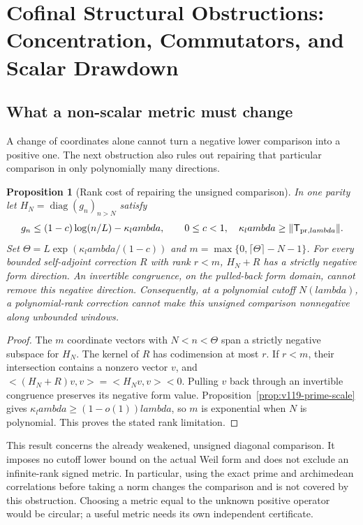 \documentclass[11pt]{article}
\def\lambda{lambda}%
\def\ip#1#2{<#1,#2>}%
\newtheorem{proposition}[theorem]{Proposition}
\theoremstyle{remark}
\newcommand{\ip}[2]{\left\langle #1,#2\right\rangle}
\begin{document}
\section{Cofinal Structural Obstructions: Concentration, Commutators, and Scalar Drawdown}\label{sec:pillar3a}

\subsection{What a non-scalar metric must change}
A change of coordinates alone cannot turn a negative lower comparison
into a positive one. The next obstruction also rules out repairing
that particular comparison in only polynomially many directions.

\begin{proposition}[Rank cost of repairing the unsigned comparison]
\label{prop:v127-rank-barrier}
In one parity let $H_N=\operatorname{diag}(g_n)_{n>N}$ satisfy
\[
 g_n\le(1-c)\log(n/L)-\kappa_\lambda,\qquad 0\le c<1,
 \quad \kappa_\lambda\ge\|\mathsf T_{{\rm pr},\lambda}\|.
\]
Set $\Theta=L\exp(\kappa_\lambda/(1-c))$ and
$m=\max\{0,\lceil\Theta\rceil-N-1\}$. For every bounded self-adjoint
correction $R$ with rank $r<m$, $H_N+R$ has a strictly negative
form direction. An invertible congruence, on the pulled-back form
domain, cannot remove this negative direction. Consequently, at a
polynomial cutoff $N(\lambda)$, a polynomial-rank correction cannot
make this unsigned comparison nonnegative along unbounded windows.
\end{proposition}
\begin{proof}
The $m$ coordinate vectors with $N<n<\Theta$ span a strictly negative
subspace for $H_N$. The kernel of $R$ has codimension at most $r$.
If $r<m$, their intersection contains a nonzero vector $v$, and
$\ip{(H_N+R)v}{v}=\ip{H_Nv}{v}<0$. Pulling $v$ back through an
invertible congruence preserves its negative form value.
Proposition~\ref{prop:v119-prime-scale} gives
$\kappa_\lambda\ge(1-o(1))\lambda$, so $m$ is exponential when
$N$ is polynomial. This proves the stated rank limitation.
\end{proof}

This result concerns the already weakened, unsigned diagonal
comparison. It imposes no cutoff lower bound on the actual Weil form
and does not exclude an infinite-rank signed metric. In particular,
using the exact prime and archimedean correlations before taking a
norm changes the comparison and is not covered by this obstruction.
Choosing a metric equal to the unknown positive operator would be
circular; a useful metric needs its own independent certificate.
\end{document}
